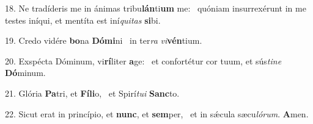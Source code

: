 18. Ne tradíderis me in ánimas tribu\textbf{lán}ti\textbf{um} me: \ast\  quóniam insurrexérunt in me testes iníqui, et mentíta est iní\textit{qui}\textit{tas} \textbf{si}bi.\

19. Credo vidére \textbf{bo}na \textbf{Dó}\textbf{mi}ni \ast\  in ter\textit{ra} \textit{vi}\textbf{vén}tium.\

20. Exspécta Dóminum, vi\textbf{rí}liter \textbf{a}ge: \ast\  et confortétur cor tuum, et sús\textit{ti}\textit{ne} \textbf{Dó}minum.\

21. Glória \textbf{Pa}tri, et \textbf{Fí}\textbf{li}o, \ast\  et Spirí\textit{tu}\textit{i} \textbf{Sanc}to.\

22. Sicut erat in princípio, et \textbf{nunc}, et \textbf{sem}per, \ast\  et in sǽcula sæcu\textit{ló}\textit{rum}. \textbf{A}men.\

